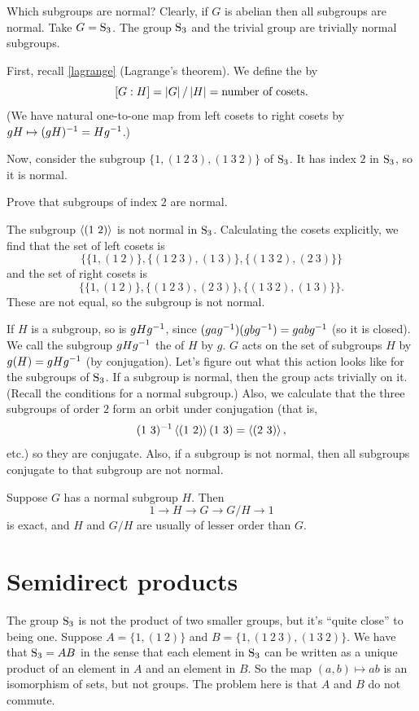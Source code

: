\documentclass[11pt, oneside]{amsart}
\begin{document}
Which subgroups are normal? Clearly, if $G$ is abelian then all subgroups are normal. Take $G=\operatorname{S}_3$. The group $\operatorname{S}_3$ and the trivial group are trivially normal subgroups. 

First, recall \cref{lagrange} (Lagrange's theorem). We define the  by
$$
\left [G : H \right] = \left \lvert G \right \rvert/\left \lvert H \right \rvert = \textrm{number of cosets}.
$$
(We have natural one-to-one map from left cosets to right cosets by $gH \mapsto (gH)^{-1} = Hg^{-1}$.) 

Now, consider the subgroup $\{ 1, (1\ 2\ 3), (1\ 3\ 2)\}$ of $\operatorname{S}_3$. It has index $2$ in $\operatorname{S}_3$, so it is normal.
\begin{exercise}
Prove that subgroups of index $2$ are normal.
\end{exercise}
The subgroup $\left \langle (1\ 2) \right \rangle$ is not normal in $\operatorname{S}_3$. Calculating the cosets explicitly, we find that the set of left cosets is
$$
\{ \{1, (1\ 2)\} , \{ (1\ 2\ 3), (1\ 3)\}, \{(1\ 3\ 2), (2\ 3)\}\}
$$
and the set of right cosets is
$$
\{  \{1,(1\ 2)\}, \{(1\ 2\ 3), (2\ 3) \}, \{(1\ 3\ 2) , (1\ 3) \}    \}.
$$
These are not equal, so the subgroup is not normal. 


If $H$ is a subgroup, so is $gHg^{-1}$, since $(gag^{-1})(gbg^{-1}) = gabg^{-1}$ (so it is closed). We call the subgroup $gHg^{-1}$ the  of $H$ by $g$. $G$ acts on the set of subgroups $H$ by $g(H) = gHg^{-1}$ (by conjugation). Let's figure out what this action looks like for the subgroups of $\operatorname{S}_3$. If a subgroup is normal, then the group acts trivially on it. (Recall the conditions for a normal subgroup.) Also, we calculate that the three subgroups of order $2$ form an orbit under conjugation (that is, 
$$
(1\ 3)\inv\ang{(1\ 2)}(1\ 3) = \ang{(2\ 3)},
 $$
etc.) so they are conjugate. Also, if a subgroup is not normal, then all subgroups conjugate to that subgroup are not normal.

Suppose $G$ has a normal subgroup $H$. Then 
$$
1\longrightarrow H \longrightarrow G \longrightarrow G/H \longrightarrow 1
$$
is exact, and $H$ and $G/H$ are usually of lesser order than $G$.

\section{Semidirect products}
The group $\operatorname{S}_3$ is not the product of two smaller groups, but it's ``quite close'' to being one. Suppose $A = \{ 1, (1\ 2)\}$ and $B = \{1, (1\ 2\ 3), (1\ 3\ 2)\}$. We have that $\operatorname{S}_3 = AB$ in the sense that each element in $\operatorname{S}_3$ can be written as a unique product of an element in $A$ and an element in $B$. So the map $(a,b) \mapsto ab$ is an isomorphism of sets, but not groups. The problem here is that $A$ and $B$ do not commute. 
\end{document}
